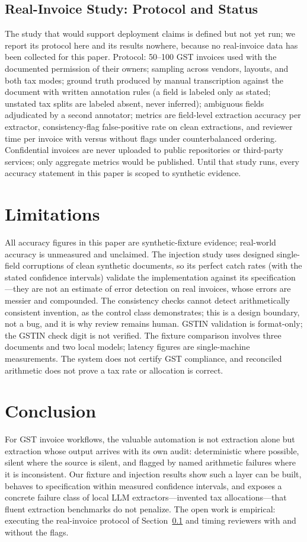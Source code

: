 \documentclass[conference]{IEEEtran}
\begin{document}
\subsection{Real-Invoice Study: Protocol and Status}\label{sec:real}
The study that would support deployment claims is defined but not yet run; we report its protocol here and its results nowhere, because no real-invoice data has been collected for this paper. Protocol: 50--100 GST invoices used with the documented permission of their owners; sampling across vendors, layouts, and both tax modes; ground truth produced by manual transcription against the document with written annotation rules (a field is labeled only as stated; unstated tax splits are labeled absent, never inferred); ambiguous fields adjudicated by a second annotator; metrics are field-level extraction accuracy per extractor, consistency-flag false-positive rate on clean extractions, and reviewer time per invoice with versus without flags under counterbalanced ordering. Confidential invoices are never uploaded to public repositories or third-party services; only aggregate metrics would be published. Until that study runs, every accuracy statement in this paper is scoped to synthetic evidence.

\section{Limitations}\label{sec:limits}
All accuracy figures in this paper are synthetic-fixture evidence; real-world accuracy is unmeasured and unclaimed. The injection study uses designed single-field corruptions of clean synthetic documents, so its perfect catch rates (with the stated confidence intervals) validate the implementation against its specification---they are not an estimate of error detection on real invoices, whose errors are messier and compounded. The consistency checks cannot detect arithmetically consistent invention, as the control class demonstrates; this is a design boundary, not a bug, and it is why review remains human. GSTIN validation is format-only; the GSTIN check digit is not verified. The fixture comparison involves three documents and two local models; latency figures are single-machine measurements. The system does not certify GST compliance, and reconciled arithmetic does not prove a tax rate or allocation is correct.

\section{Conclusion}
For GST invoice workflows, the valuable automation is not extraction alone but extraction whose output arrives with its own audit: deterministic where possible, silent where the source is silent, and flagged by named arithmetic failures where it is inconsistent. Our fixture and injection results show such a layer can be built, behaves to specification within measured confidence intervals, and exposes a concrete failure class of local LLM extractors---invented tax allocations---that fluent extraction benchmarks do not penalize. The open work is empirical: executing the real-invoice protocol of Section~\ref{sec:real} and timing reviewers with and without the flags.
\end{document}
